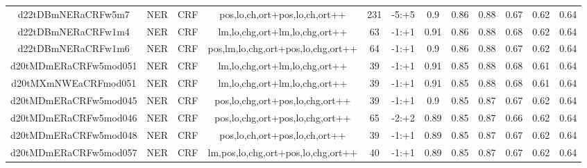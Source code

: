 \documentclass[a4paper]{article}
\begin{document}
\begin{landscape}
\begin{center}
\begin{tabular}{ |c|c|c|c|c|c|c|c|c|c|c|c|}
 	
 		
 		\small{ d22tDBmNERaCRFw5m7 } & NER & CRF & pos,lo,ch,ort+pos,lo,ch,ort++  &  231 &  -5:+5  &  0.9 & 0.86 & 0.88  &  0.67 & 0.62 & 0.64 \\
 		

 	
 
 	
 		
 		\small{ d22tDBmNERaCRFw1m4 } & NER & CRF & lm,lo,chg,ort+lm,lo,chg,ort++  &  63 &  -1:+1  &  0.91 & 0.86 & 0.88  &  0.68 & 0.62 & 0.64 \\
 		

 	
 
 	
 		
 		\small{ d22tDBmNERaCRFw1m6 } & NER & CRF & pos,lm,lo,chg,ort+pos,lo,chg,ort++  &  64 &  -1:+1  &  0.9 & 0.86 & 0.88  &  0.67 & 0.62 & 0.64 \\
 		

 	
 
 	
 		
 		\small{ d20tMDmERaCRFw5mod051 } & NER & CRF & lm,lo,chg,ort+lm,lo,chg,ort++  &  39 &  -1:+1  &  0.91 & 0.85 & 0.88  &  0.68 & 0.61 & 0.64 \\
 		

 	
 
 	
 		
 		\small{ d20tMXmNWEaCRFmod051 } & NER & CRF & lm,lo,chg,ort+lm,lo,chg,ort++  &  39 &  -1:+1  &  0.91 & 0.85 & 0.88  &  0.68 & 0.61 & 0.64 \\
 		

 	
 
 	
 		
 		\small{ d20tMDmERaCRFw5mod045 } & NER & CRF & pos,lo,chg,ort+pos,lo,chg,ort++  &  39 &  -1:+1  &  0.9 & 0.85 & 0.87  &  0.67 & 0.62 & 0.64 \\
 		

 	
 
 	
 		
 		\small{ d20tMDmERaCRFw5mod046 } & NER & CRF & pos,lo,chg,ort+pos,lo,chg,ort++  &  65 &  -2:+2  &  0.89 & 0.85 & 0.87  &  0.66 & 0.62 & 0.64 \\
 		

 	
 
 	
 		
 		\small{ d20tMDmERaCRFw5mod048 } & NER & CRF & pos,lo,ch,ort+pos,lo,ch,ort++  &  39 &  -1:+1  &  0.89 & 0.85 & 0.87  &  0.67 & 0.62 & 0.64 \\
 		

 	
 
 	
 		
 		\small{ d20tMDmERaCRFw5mod057 } & NER & CRF & lm,pos,lo,chg,ort+pos,lo,chg,ort++  &  40 &  -1:+1  &  0.89 & 0.85 & 0.87  &  0.67 & 0.62 & 0.64 \\
 		


\end{tabular}
\end{center}
\end{landscape}
\end{document}
